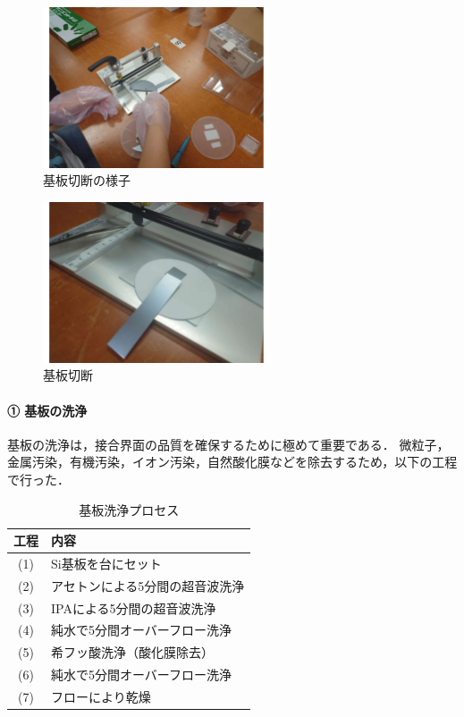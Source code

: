 \begin{figure}[H]
    \centering
    \includegraphics[width=0.6\textwidth]{figure/20250722_131053.pdf}
    \caption{基板切断の様子}
    \label{fig:washing_flow}
\end{figure}

\begin{figure}[H]
    \centering
    \includegraphics[width=0.6\textwidth]{figure/20250722_132215.pdf}
    \caption{基板切断}
\end{figure}


\paragraph{① 基板の洗浄}

基板の洗浄は，接合界面の品質を確保するために極めて重要である．  
微粒子，金属汚染，有機汚染，イオン汚染，自然酸化膜などを除去するため，以下の工程で行った．


\begin{table}[H]
    \centering
    \caption{基板洗浄プロセス}
    \label{tab:wash_process}
    \begin{tabular}{cl}
        \hline
        工程 & 内容 \\
        \hline
        (1) & Si基板を台にセット \\
        (2) & アセトンによる5分間の超音波洗浄 \\
        (3) & IPAによる5分間の超音波洗浄 \\
        (4) & 純水で5分間オーバーフロー洗浄 \\
        (5) & 希フッ酸洗浄（酸化膜除去） \\
        (6) & 純水で5分間オーバーフロー洗浄 \\
        (7) & フローにより乾燥 \\
        \hline
    \end{tabular}
\end{table}

